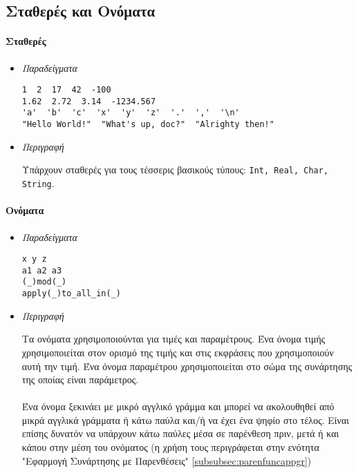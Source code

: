 \documentclass[diploma]{softlab-thesis}
\begin{document}
\subsection{Σταθερές και Ονόματα}

\paragraph{Σταθερές}
\begin{itemize}

\item \textit{Παραδείγματα}
\begin{verbatim}
1  2  17  42  -100
1.62  2.72  3.14  -1234.567
'a'  'b'  'c'  'x'  'y'  'z'  '.'  ','  '\n'
"Hello World!"  "What's up, doc?"  "Alrighty then!"
\end{verbatim}

\item \textit{Περιγραφή}

Υπάρχουν σταθερές για τους τέσσερις βασικούς τύπους:
\texttt{Int, Real, Char, String}.

\end{itemize}

\paragraph{Ονόματα}
\begin{itemize}

\item \textit{Παραδείγματα}
\begin{verbatim}
x y z
a1 a2 a3
(_)mod(_)
apply(_)to_all_in(_)
\end{verbatim}

\item \textit{Περιγραφή}

Τα ονόματα χρησιμοποιούνται για τιμές και παραμέτρους. Ένα όνομα τιμής
χρησιμοποιείται στον ορισμό της τιμής και στις εκφράσεις που χρησιμοποιούν
αυτή την τιμή. Ένα όνομα παραμέτρου χρησιμοποιείται στο σώμα της συνάρτησης
της οποίας είναι παράμετρος.
\\\\
Ένα όνομα ξεκινάει με μικρό αγγλικό γράμμα και μπορεί να ακολουθηθεί
από μικρά αγγλικά γράμματα ή κάτω παύλα και/ή να έχει ένα ψηφίο στο τέλος.
Είναι επίσης δυνατόν να υπάρχουν κάτω παύλες μέσα σε παρένθεση πριν, μετά ή
και κάπου στην μέση του ονόματος (η χρήση τους περιγράφεται στην ενότητα
"Εφαρμογή Συνάρτησης με Παρενθέσεις" \ref{subsubsec:parenfuncappgr})

\end{itemize}
\end{document}
